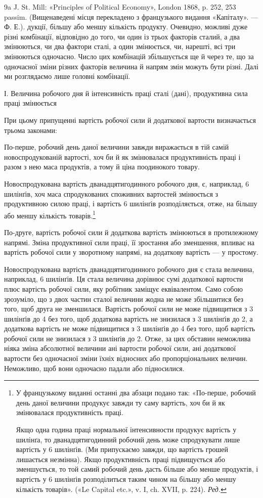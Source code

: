 9a J. St. Mill: «Principles of Political Economy», London 1868,
p. 252, 253 passim. (Вищенаведені місця перекладено з французького
видання «Капіталу». — Ф. Е.).
дукції, більшу або меншу кількість продукту. Очевидно, можливі
дуже різні комбінації, відповідно до того, чи один із трьох факторів
сталий, а два змінюються, чи два фактори сталі, а один
змінюється, чи, нарешті, всі три змінюються одночасно. Число
цих комбінацій збільшується ще й через те, що за одночасної
зміни різних факторів величина й напрям змін можуть бути
різні. Далі ми розглядаємо лише головні комбінації.

І. Величина робочого дня й інтенсивність праці сталі (дані),
продуктивна сила праці змінюється

При цьому припущенні вартість робочої сили й додаткової
вартости визначається трьома законами:

По-перше, робочий день даної величини завжди виражається
в тій самій новоспродукованій вартості, хоч би й як змінювалася
продуктивність праці і разом з нею маса продуктів, а тому й
ціна поодинокого товару.

Новоспродукована вартість дванадцятигодинного робочого
дня, є, наприклад, 6 шилінґів, хоч маса спродукованих споживних
вартостей змінюється з продуктивною силою праці, і вартість
6 шилінґів розподіляється, отже, на більшу або меншу кількість
товарів.\footnote*{
У французькому виданні останні два абзаци подано так: «По-перше,
робочий день даної величини продукує завжди ту саму вартість,
хоч би й як змінювалася продуктивність праці.

Якщо одна година праці нормальної інтенсивности продукує вартість
у  шилінґа, то дванадцятигодинний робочий день може спродукувати
лише вартість у 6 шилінґів. (Ми припускаємо завжди, що вартість грошей
лишається незмінна). Якщо продуктивність праці підвищується або зменшується,
то той самий робочий день дасть більше або менше продуктів,
і вартість у 6 шилінґів розподілиться таким чином на більшу або меншу
кількість товарів». («Le Capital etc.», v. I, ch. XVII, p. 224). \emph{Ред.}
}

По-друге, вартість робочої сили й додаткова вартість змінюються
в протилежному напрямі. Зміна продуктивної сили праці,
її зростання або зменшення, впливає на вартість робочої сили у
зворотному напрямі, на додаткову вартість — у простому.

Новоспродукована вартість дванадцятигодинного робочого
дня є стала величина, наприклад, 6 шилінґів. Ця стала величина
дорівнює сумі додаткової вартости плюс вартість робочої сили,
яку робітник заміщує еквівалентом. Само собою зрозуміло, що
з двох частин сталої величини жодна не може збільшитися без
того, щоб друга не зменшилася. Вартість робочої сили не може
підвищитися з 3 шилінґів до 4 без того, щоб додаткова вартість
не знизилася з 3 шилінґів до 2, а додаткова вартість не може
підвищитися з 3 шилінґів до 4 без того, щоб вартість робочої
сили не знизилася з 3 шилінґів до 2. Отже, за цих обставин неможлива
ніяка зміна абсолютної величини ані вартости робочої
сили, ані додаткової вартости без одночасної зміни їхніх відносних
або пропорціональних величин. Неможливо, щоб вони одночасно
падали або підносилися.
